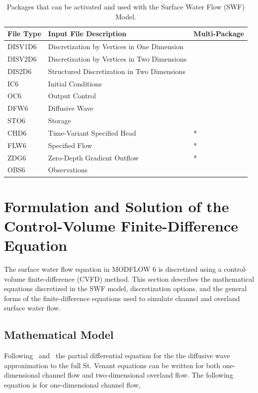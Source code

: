 \documentclass[fleqn]{article}
\begin{document}
\begin{table}[ht]
   \caption{Packages that can be activated and used with the Surface Water Flow (SWF) Model.}
   \begin{tabular*}{\columnwidth}{l l l}
   \hline
   \hline
   File Type & Input File Description & Multi-Package \\
   \hline
   DISV1D6 & Discretization by Vertices in One Dimension \\
   DISV2D6 & Discretization by Vertices in Two Dimensions \\
   DIS2D6 & Structured Discretization in Two Dimensions \\
   IC6 & Initial Conditions \\
   OC6 & Output Control \\
   DFW6 & Diffusive Wave \\ 
   STO6 & Storage \\
   CHD6 & Time-Variant Specified Head & * \\
   FLW6 & Specified Flow & * \\
   ZDG6 & Zero-Depth Gradient Outflow & * \\
   OBS6 & Observations \\
   \hline 
   \end{tabular*}
   \label{table:ftype-swf}
  \end{table}

\section{Formulation and Solution of the Control-Volume Finite-Difference Equation}

The surface water flow equation in MODFLOW 6 is discretized using a control-volume finite-difference (CVFD) method. This section describes the mathematical equations discretized in the SWF model, discretization options, and the general forms of the finite-difference equations used to simulate channel and overland surface water flow.

\subsection{Mathematical Model}
Following~\cite{panday2004} and~\cite{hughes2012documentation} the partial differential equation for the the diffusive wave approximation to the full St. Venant equations can be written for both one-dimensional channel flow and two-dimensional overland flow.  The following equation is for one-dimensional channel flow,
\end{document}
